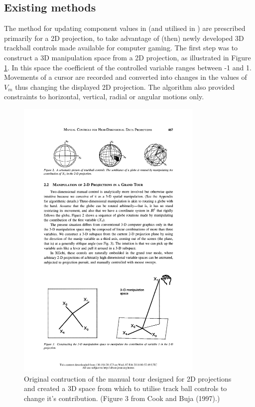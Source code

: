 \documentclass[]{interact}
\theoremstyle{plain}%
\theoremstyle{definition}
\theoremstyle{remark}
\begin{document}
\hypertarget{existing-methods}{%
\subsection{Existing methods}\label{existing-methods}}

The method for updating component values in \citet{cook_manual_1997}
(and utilised in \citet{spyrison_spinifex_2020}) are prescribed
primarily for a 2D projection, to take advantage of (then) newly
developed 3D trackball controls made available for computer gaming. The
first step was to construct a 3D manipulation space from a 2D
projection, as illustrated in Figure \ref{manipspace}. In this space the
coefficient of the controlled variable ranges between -1 and 1.
Movements of a cursor are recorded and converted into changes in the
values of \(V_m\) thus changing the displayed 2D projection. The
algorithm also provided constraints to horizontal, vertical, radial or
angular motions only.

\begin{figure}[ht]
\centerline{\includegraphics[width=0.8\textwidth]{figures/manip_space.pdf}}
\caption{Original contruction of the manual tour designed for 2D projections and created a 3D space from which to utilise track ball controls to change it's contribution. (Figure 3 from Cook and Buja (1997).)}
\label{manipspace}
\end{figure}
\end{document}
